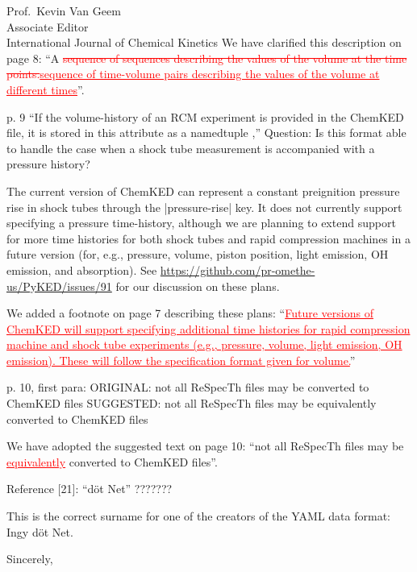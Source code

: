 \documentclass[11pt]{OSUletter}
\newcommand{\addtwo}[1]{{\sloppy\textcolor{red}{\uline{#1}}}}  %
\newcommand{\deletetwo}[1]{\sloppy\textcolor{red}{\sout{#1}}}    %
\begin{document}
\begin{letter}{
               Prof.~Kevin Van Geem\\
               Associate Editor\\
               International Journal of Chemical Kinetics
               }
We have clarified this description on page 8:
``A \deletetwo{sequence of sequences describing the values of
the volume at the time points.}\addtwo{sequence of time-volume pairs describing the values
of the volume at different times}''.

\begin{quoting}
    p. 9
    ``If the volume-history of an RCM experiment is provided in the
    ChemKED file, it is stored in this attribute as a namedtuple ,''
    Question: Is this format able to handle the case when a shock tube measurement
    is accompanied with a pressure history?
\end{quoting}

The current version of ChemKED can represent a constant preignition pressure rise
in shock tubes through the \yabox|pressure-rise| key. It does not currently
support specifying a pressure time-history, although we are planning to extend
support for more time histories for both shock tubes and rapid compression
machines in a future version (for, e.g., pressure, volume, piston position, light
emission, OH emission, and absorption). See \url{https://github.com/pr-omethe-us/PyKED/issues/91}
for our discussion on these plans.

We added a footnote on page 7 describing these plans:
``\addtwo{Future versions of ChemKED will support specifying additional time histories for
rapid compression machine and shock tube experiments (e.g., pressure, volume, light emission, OH emission).
These will follow the specification format given for volume.}''

\begin{quoting}
    p. 10, first para:
    ORIGINAL:
    not all ReSpecTh files may be converted to ChemKED files
    SUGGESTED:
    not all ReSpecTh files may be equivalently converted to ChemKED files
\end{quoting}

We have adopted the suggested text on page 10:
``not all ReSpecTh files may be \addtwo{equivalently} converted to ChemKED files''.

\begin{quoting}
    Reference [21]:
    ``döt Net''   ???????
\end{quoting}

This is the correct surname for one of the creators of the YAML data format: Ingy döt Net.

\vspace{1em}

\closing{Sincerely,}




\end{letter}
\end{document}
